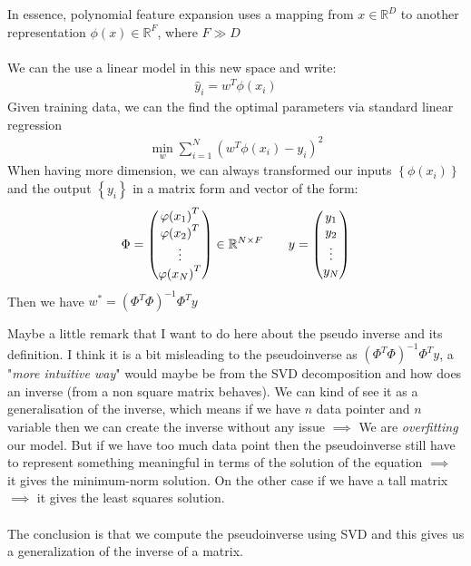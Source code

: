 	In essence, polynomial feature expansion uses a mapping from $x \in \mathbb{R}^{D}$ to another representation $\phi\left(x\right) \in \mathbb{R}^{F}$, where $F \gg D$\\
	$ $\\
	We can the use a linear model in this new space and write:
	\begin{align*} 
		\hat{y}_i = w^{T}\phi\left(x_i\right)
	\end{align*}
	Given training data, we can the find the optimal parameters via standard linear regression
	\begin{align*} 
		\min_w \sum_{i= 1}^{N}\left(w^{T}\phi\left(x_i\right) - y_i\right)^2
	\end{align*}
	When having more dimension, we can always transformed our inputs $\left\{\phi\left(x_i\right)\right\}$ and the output $\left\{y_i\right\}$ in a matrix form and vector of the form:
	\begin{align*} 
		\Phi =  \begin{pmatrix} \phi\left(x_1\right)^{T} \\ \phi\left(x_2\right)^{T} \\ \vdots \\ \phi\left(x_N\right)^{T} \end{pmatrix} \in \mathbb{R}^{N \times F} \mathspace \mathspace y = \begin{pmatrix} y_1 \\ y_2 \\ \vdots \\ y_N \end{pmatrix} 
	\end{align*}
	Then we have $w^{\ast} = \left(\Phi^{T}\Phi\right)^{-1} \Phi^{T}y$
	\begin{framedremark}
	Maybe a little remark that I want to do here about the pseudo inverse and its definition. I think it is a bit misleading to  the pseudoinverse as $\left(\Phi^{T}\Phi\right)^{-1} \Phi^{T}y$, a "\textit{more intuitive way}" would maybe be from the SVD decomposition and how does an inverse (from a non square matrix behaves). We can kind of see it as a generalisation of the inverse, which means if we have $n$ data pointer and $n$ variable then we can create the inverse without any issue $\implies$ We are \textit{overfitting} our model. But if we have too much data point then the pseudoinverse still have to represent something meaningful in terms of the solution of the equation $\implies$ it gives the minimum-norm solution. On the other case if we have a tall matrix $\implies$ it gives the least squares solution.\\
	$ $\\
	The conclusion is that we compute the pseudoinverse using SVD and this gives us a generalization of the inverse of a matrix.
	\end{framedremark}

